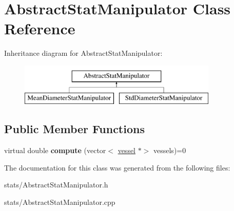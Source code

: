 \hypertarget{class_abstract_stat_manipulator}{}\section{Abstract\+Stat\+Manipulator Class Reference}
\label{class_abstract_stat_manipulator}
Inheritance diagram for Abstract\+Stat\+Manipulator\+:\begin{figure}[H]
\begin{center}
\leavevmode
\includegraphics[height=2.000000cm]{class_abstract_stat_manipulator}
\end{center}
\end{figure}
\subsection*{Public Member Functions}
\begin{DoxyCompactItemize}
\item 
\mbox{\label{class_abstract_stat_manipulator_aaea26f915b7a0a27c5439438506fd8b6}} 
virtual double {\bfseries compute} (vector$<$ \mbox{\hyperlink{structvessel}{vessel}} $\ast$$>$ vessels)=0
\end{DoxyCompactItemize}


The documentation for this class was generated from the following files\+:\begin{DoxyCompactItemize}
\item 
stats/Abstract\+Stat\+Manipulator.\+h\item 
stats/Abstract\+Stat\+Manipulator.\+cpp\end{DoxyCompactItemize}
